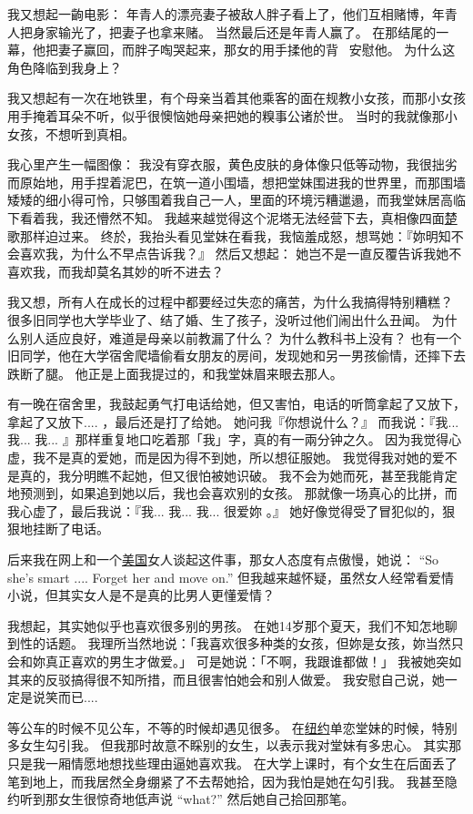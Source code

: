 \documentclass[12pt]{report}
\begin{document}
我又想起一齣电影： 年青人的漂亮妻子被敌人胖子看上了，他们互相赌博，年青人把身家输光了，把妻子也拿来赌。  当然最后还是年青人赢了。  在那结尾的一幕，他把妻子赢回，而胖子啕哭起来，那女的用手揉他的背 ~安慰他。  为什么这角色降临到我身上？

我又想起有一次在地铁里，有个母亲当着其他乘客的面在规教小女孩，而那小女孩用手掩着耳朵不听，似乎很懊恼她母亲把她的糗事公诸於世。  当时的我就像那小女孩，不想听到真相。

我心里产生一幅图像： 我没有穿衣服，黄色皮肤的身体像只低等动物，我很拙劣而原始地，用手捏着泥巴，在筑一道小围墙，想把堂妹围进我的世界里，而那围墙矮矮的细小得可怜，只够围着我自己一人，里面的环境污糟邋遢，而我堂妹居高临下看着我，我还懵然不知。  我越来越觉得这个泥塔无法经营下去，真相像四面\uline{楚}歌那样迫过来。  终於，我抬头看见堂妹在看我，我恼羞成怒，想骂她：『妳明知不会喜欢我，为什么不早点告诉我？』  然后又想起： 她岂不是一直反覆告诉我她不喜欢我，而我却莫名其妙的听不进去？

我又想，所有人在成长的过程中都要经过失恋的痛苦，为什么我搞得特别糟糕？  很多旧同学也大学毕业了、结了婚、生了孩子，没听过他们闹出什么丑闻。  为什么别人适应良好，难道是母亲以前教漏了什么？   为什么教科书上没有？   也有一个旧同学，他在大学宿舍爬墙偷看女朋友的房间，发现她和另一男孩偷情，还摔下去跌断了腿。   他正是上面我提过的，和我堂妹眉来眼去那人。

有一晚在宿舍里，我鼓起勇气打电话给她，但又害怕，电话的听筒拿起了又放下，拿起了又放下.... ，最后还是打了给她。 她问我『你想说什么？』   而我说：『我... 我... 我... 』那样重复地口吃着那「我」字，真的有一兩分钟之久。  因为我觉得心虚，我不是真的爱她，而是因为得不到她，所以想征服她。  我觉得我对她的爱不是真的，我分明瞧不起她，但又很怕被她识破。  我不会为她而死，甚至我能肯定地预测到，如果追到她以后，我也会喜欢别的女孩。  那就像一场真心的比拼，而我心虚了，最后我说：『我... 我... 我... 很爱妳 。』  她好像觉得受了冒犯似的，狠狠地挂断了电话。

后来我在网上和一个\uline{美国}女人谈起这件事，那女人态度有点傲慢，她说： ``So she's smart .... Forget her and move on.''  但我越来越怀疑，虽然女人经常看爱情小说，但其实女人是不是真的比男人更懂爱情？

我想起，其实她似乎也喜欢很多别的男孩。 在她14岁那个夏天，我们不知怎地聊到性的话题。  我理所当然地说：「我喜欢很多种类的女孩，但妳是女孩，妳当然只会和妳真正喜欢的男生才做爱。」 可是她说：「不啊，我跟谁都做！」 我被她突如其来的反驳搞得很不知所措，而且很害怕她会和别人做爱。 我安慰自己说，她一定是说笑而已....

等公车的时候不见公车，不等的时候却遇见很多。  在\uline{纽约}单恋堂妹的时候，特别多女生勾引我。 但我那时故意不睬别的女生，以表示我对堂妹有多忠心。  其实那只是我一厢情愿地想找些理由逼她喜欢我。  在大学上课时，有个女生在后面丢了笔到地上，而我居然全身绷紧了不去帮她拾，因为我怕是她在勾引我。  我甚至隐约听到那女生很惊奇地低声说 ``what?'' 然后她自己拾回那笔。
\end{document}
